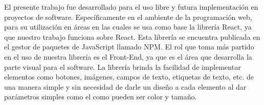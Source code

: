 El presente trabajo fue desarrollado para el uso libre y futura implementación en proyectos de software. Específicamente en el ambiente de la programación web, para su utilización en áreas en las cuales se usa como base la librería React, ya que nuestro trabajo funciona sobre React.
 \newline
  \newline
Esta librería se encuentra publicada en el gestor de paquetes de JavaScript llamado NPM. 
 \newline
  \newline
El rol que toma más partido en el uso de nuestra librería es el Front-End, ya que es el área que desarrolla la parte visual para el software. La librería brinda la facilidad de implementar elementos como botones, imágenes, campos de texto, etiquetas de texto, etc. de una manera simple y sin necesidad de darle un diseño a cada elemento al dar parámetros simples como el como pueden ser color y tamaño.
